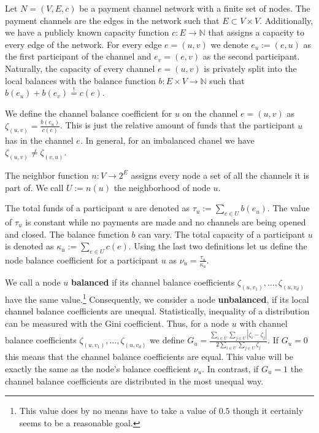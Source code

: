 \documentclass[conference]{IEEEtran}
\begin{document}
Let $N=(V,E,c)$ be a payment channel network with a finite set of nodes.
The payment channels are the edges in the network such that $E\subset V\times V$.
Additionally, we have a publicly known capacity function $c: E\longrightarrow \mathbb{N}$ that assigns a capacity to every edge of the network.
For every edge $e=(u,v)$ we denote $e_u:=(e,u)$ as the first participant of the channel and $e_v=(e,v)$ as the second participant.
Naturally, the capacity of every channel $e=(u,v)$ is privately split into the local balances with the balance function $b: E\times V\longrightarrow\mathbb{N}$ such that $b(e_u)+b(e_v)\stackrel{!}{=}c(e)$.

We define the channel balance coefficient for $u$ on the channel $e=(u,v)$ as  $\zeta_{(u,v)} = \frac{b(e_u)}{c(e)}$.
This is just the relative amount of funds that the participant $u$ has in the channel $e$.
In general, for an imbalanced chanel we have $\zeta_{(u,v)} \neq \zeta_{(v,u)}$.

The neighbor function $n : V \longrightarrow 2^{E}$ assigns every node a set of all the channels it is part of.
We call $U:=n(u)$ the neighborhood of node $u$.

The total funds of a participant $u$ are denoted as $\tau_u:=\displaystyle{\sum_{e\in U}b(e_u)}$.
The value of $\tau_u$ is constant while no payments are made and no channels are being opened and closed.
The balance function $b$ can vary.
The total capacity of a participant $u$ is denoted as $\kappa_u:=\displaystyle{\sum_{e\in U}c(e)}$.
Using the last two definitions let us define the node balance coefficient for a participant $u$ as $\nu_u = \frac{\tau_u}{\kappa_u}$.

We call a node $u$ {\bf balanced} if its channel balance coefficients $\zeta_{(u,v_1)},\dots,\zeta_{(u,v_d)}$ have the same value.\footnote{This value does by no means have to take a value of $0.5$ though it certainly seems to be a reasonable goal.}
Consequently, we consider a node {\bf unbalanced}, if its local channel balance coefficients are unequal.
Statistically, inequality of a distribution can be measured with the Gini coefficient.
Thus, for a node $u$ with channel balance coefficients $\zeta_{(u,v_1)},\dots,\zeta_{(u,v_d)}$ we define $G_u = \frac{\displaystyle{\sum_{i\in U} \sum_{j \in U}} | \zeta_i - \zeta_j |}{2 \displaystyle{\sum_{i \in U} \sum_{j \in U} \zeta_j}}$.
If $G_u = 0$ this means that the channel balance coefficients are equal.
This value will be exactly the same as the node's balance coefficient $\nu_u$.
In contrast, if $G_u = 1$ the channel balance coefficients are distributed in the most unequal way.
\end{document}
